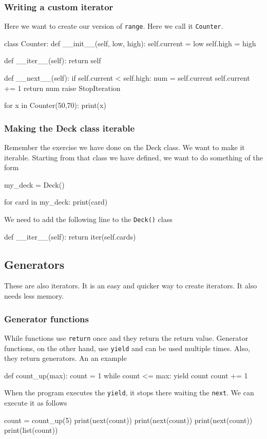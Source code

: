 \subsubsection{Writing a custom iterator}

Here we want to create our version of \verb|range|. Here we call it \verb|Counter|.
\begin{listing}{1}
class Counter:
    def __init__(self, low, high):
        self.current = low
        self.high = high 

    def __iter__(self):
        return self 

    def __next__(self):
        if self.current < self.high:
            num = self.current
            self.current += 1
            return num 
        raise StopIteration

for x in Counter(50,70):
    print(x)
\end{listing}

\subsubsection{Making the Deck class iterable}

Remember the exercise we have done on the Deck class. We want to make it iterable. Starting from that class we have defined, we want to do something of the form 
\begin{listing}{1}
my_deck = Deck()

for card in my_deck:
    print(card)
\end{listing}
We need to add the following line to the \verb|Deck()| class
\begin{listing}{1}
    def __iter__(self):
        return iter(self.cards)
\end{listing}

\subsection{Generators}

These are also iterators. It is an easy and quicker way to create iterators. It also needs less memory. 

\subsubsection{Generator functions}

While functions use \verb|return| once and they return the return value. Generator functions, on the other hand, use \verb|yield| and can be used multiple times. Also, they return generators. An an example
\begin{listing}{1}
def count_up(max):
    count = 1
    while count <= max:
        yield count
        count += 1    
\end{listing}
When the program executes the \verb|yield|, it stops there waiting the \verb|next|. We can execute it as follows
\begin{listingcont}
count = count_up(5)
print(next(count))
print(next(count))
print(next(count))    
print(list(count))
\end{listingcont}

